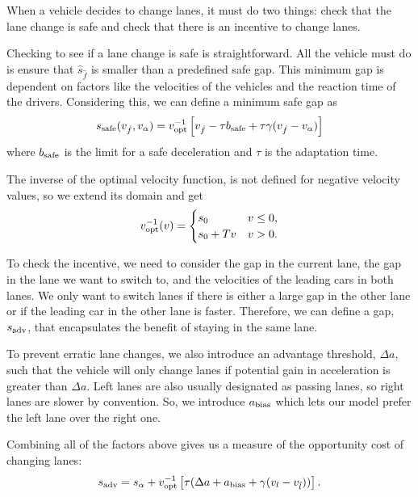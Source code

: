 \documentclass[12pt]{article}
\begin{document}
      When a vehicle decides to change lanes, it must do two things: check that the lane change is safe and check that there is an incentive to change lanes.

      Checking to see if a lane change is safe is straightforward. All the vehicle must do is ensure that $\hat s_{\hat f}$ is smaller than a predefined safe gap. This minimum gap is dependent on factors like the velocities of the vehicles and the reaction time of the drivers. 
      Considering this, we can define a minimum safe gap as 
      \begin{equation}
        s_{\rm safe} (v_{\hat f}, v_{\alpha}) = v_{\rm opt}^{-1} \left[v_{\hat f} -\tau b_{\rm safe} + \tau \gamma (v_{\hat f} - v_{\alpha}) \right]
      \end{equation}
      where $b_{\rm safe}$ is the limit for a safe deceleration and $\tau$ is the adaptation time. 

      The inverse of the optimal velocity function, is not defined for negative velocity values, so we extend its domain and get
      \begin{equation}
        v_{\rm opt}^{-1}(v) = \begin{cases}
          s_0 & v \leq 0,\\
          s_0 + Tv & v > 0.\\
        \end{cases}
      \end{equation}

      To check the incentive, we need to consider the gap in the current lane, the gap in the lane we want to switch to, and the velocities of the leading cars in both lanes. We only want to switch lanes if there is either a large gap in the other lane or if the leading car in the other lane is faster. Therefore, we can define a gap, $s_{\rm adv}$, that encapsulates the benefit of staying in the same lane. 
      
      To prevent erratic lane changes, we also introduce an advantage threshold, $\Delta a$, such that the vehicle will only change lanes if potential gain in acceleration is greater than $\Delta a$.  Left lanes are also usually designated as passing lanes, so right lanes are slower by convention. So, we introduce $a_{\rm bias}$ which lets our model prefer the left lane over the right one. 
      
      Combining all of the factors above gives us a measure of the opportunity cost of changing lanes:
      \begin{equation}
        s_{\rm adv} = s_{\alpha} + v_{\rm opt}^{-1} \left[\tau(\Delta a + a_{\rm bias} + \gamma(v_l - v_{\hat l}))\right].
      \end{equation}
\end{document}

